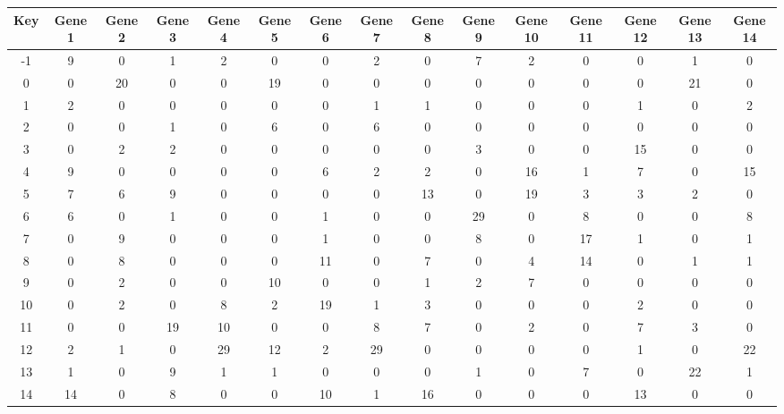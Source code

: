 \begin{tabular}{|c|c|c|c|c|c|c|c|c|c|c|c|c|c|c|}
\hline
Key & Gene 1 & Gene 2 & Gene 3 & Gene 4 & Gene 5 & Gene 6 & Gene 7 & Gene 8 & Gene 9 & Gene 10 & Gene 11 & Gene 12 & Gene 13 & Gene 14 \\
\hline
-1 & 9 & 0 & 1 & 2 & 0 & 0 & 2 & 0 & 7 & 2 & 0 & 0 & 1 & 0 \\
0 & 0 & 20 & 0 & 0 & 19 & 0 & 0 & 0 & 0 & 0 & 0 & 0 & 21 & 0 \\
1 & 2 & 0 & 0 & 0 & 0 & 0 & 1 & 1 & 0 & 0 & 0 & 1 & 0 & 2 \\
2 & 0 & 0 & 1 & 0 & 6 & 0 & 6 & 0 & 0 & 0 & 0 & 0 & 0 & 0 \\
3 & 0 & 2 & 2 & 0 & 0 & 0 & 0 & 0 & 3 & 0 & 0 & 15 & 0 & 0 \\
4 & 9 & 0 & 0 & 0 & 0 & 6 & 2 & 2 & 0 & 16 & 1 & 7 & 0 & 15 \\
5 & 7 & 6 & 9 & 0 & 0 & 0 & 0 & 13 & 0 & 19 & 3 & 3 & 2 & 0 \\
6 & 6 & 0 & 1 & 0 & 0 & 1 & 0 & 0 & 29 & 0 & 8 & 0 & 0 & 8 \\
7 & 0 & 9 & 0 & 0 & 0 & 1 & 0 & 0 & 8 & 0 & 17 & 1 & 0 & 1 \\
8 & 0 & 8 & 0 & 0 & 0 & 11 & 0 & 7 & 0 & 4 & 14 & 0 & 1 & 1 \\
9 & 0 & 2 & 0 & 0 & 10 & 0 & 0 & 1 & 2 & 7 & 0 & 0 & 0 & 0 \\
10 & 0 & 2 & 0 & 8 & 2 & 19 & 1 & 3 & 0 & 0 & 0 & 2 & 0 & 0 \\
11 & 0 & 0 & 19 & 10 & 0 & 0 & 8 & 7 & 0 & 2 & 0 & 7 & 3 & 0 \\
12 & 2 & 1 & 0 & 29 & 12 & 2 & 29 & 0 & 0 & 0 & 0 & 1 & 0 & 22 \\
13 & 1 & 0 & 9 & 1 & 1 & 0 & 0 & 0 & 1 & 0 & 7 & 0 & 22 & 1 \\
14 & 14 & 0 & 8 & 0 & 0 & 10 & 1 & 16 & 0 & 0 & 0 & 13 & 0 & 0 \\
\hline
\end{tabular}